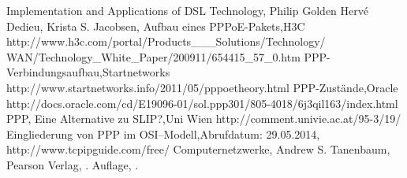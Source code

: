 \documentclass[journal,11pt]{IEEEtran}
\begin{document}
\begin{thebibliography}{1}
 Implementation and Applications of DSL Technology, \newblock Philip Golden Hervé Dedieu, \newblock Krista S. Jacobsen, 
 Aufbau eines PPPoE-Pakets,\newblock H3C \newblock http://www.h3c.com/portal/Products\_\_\_Solutions/Technology/\\WAN/Technology\_White\_Paper/200911/654415\_57\_0.htm
 PPP-Verbindungsaufbau,\newblock Startnetworks \newblock http://www.startnetworks.info/2011/05/pppoe\-theory.html
 PPP-Zustände,\newblock Oracle \newblock http://docs.oracle.com/cd/E19096-01/sol.ppp301/805-4018/6j3qil163/index.html
 PPP, Eine Alternative zu SLIP?,\newblock Uni Wien \newblock http://comment.univie.ac.at/95-3/19/
 Eingliederung von PPP im OSI--Modell,\newblock Abrufdatum: 29.05.2014, \newblock http://www.tcpipguide.com/free/
 Computernetzwerke, \newblock Andrew S. Tanenbaum,  \newblock Pearson Verlag, . Auflage, .
\end{thebibliography} 
\end{document}
